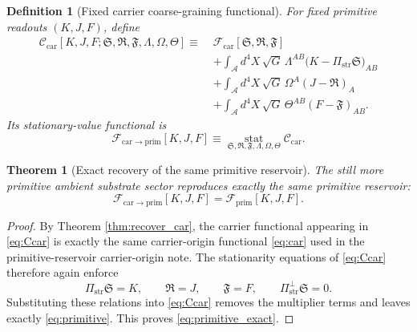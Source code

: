 \documentclass[11pt]{article}
\newcommand{\Sub}{\mathcal A}
\newcommand{\PrimFunctional}{\mathscr F_{\mathrm{prim}}}
\newcommand{\CarrierFunctional}{\mathscr F_{\mathrm{car}}}
\newcommand{\CarrierToPrim}{\mathscr F_{\mathrm{car}\to\mathrm{prim}}}
\newcommand{\PrimStrain}{K}
\newcommand{\PrimNeutral}{J}
\newcommand{\PrimFree}{F}
\newcommand{\CarrierProj}{\Pi_{\mathrm{str}}}
\newcommand{\CarrierPerp}{\Pi_{\mathrm{str}}^{\perp}}
\newcommand{\CarrierSeed}{\mathfrak S}
\newcommand{\RelabelSeed}{\mathfrak R}
\newcommand{\FreeSeed}{\mathfrak F}
\newcommand{\StrainMult}{\Lambda}
\newcommand{\NeutralMult}{\Omega}
\newcommand{\FreeMult}{\Theta}
\newtheorem{definition}{Definition}
\newtheorem{theorem}{Theorem}
\begin{document}
\begin{definition}[Fixed carrier coarse-graining functional]
\label{def:car_cg}
For fixed primitive readouts \((\PrimStrain,\PrimNeutral,\PrimFree)\), define
\begin{equation}
\begin{aligned}
\mathscr C_{\mathrm{car}}
[\PrimStrain,\PrimNeutral,\PrimFree;
\CarrierSeed,\RelabelSeed,\FreeSeed,
\StrainMult,\NeutralMult,\FreeMult]
\equiv\;
&\CarrierFunctional[\CarrierSeed,\RelabelSeed,\FreeSeed]
\\
&+\int_{\Sub} d^4X\,\sqrt{G}\,
\StrainMult^{AB}\bigl(\PrimStrain-\CarrierProj\CarrierSeed\bigr)_{AB}
\\
&+\int_{\Sub} d^4X\,\sqrt{G}\,
\NeutralMult^A(\PrimNeutral-\RelabelSeed)_A
\\
&+\int_{\Sub} d^4X\,\sqrt{G}\,
\FreeMult^{AB}(\PrimFree-\FreeSeed)_{AB}.
\end{aligned}
\label{eq:Ccar}
\end{equation}
Its stationary-value functional is
\begin{equation}
\CarrierToPrim[\PrimStrain,\PrimNeutral,\PrimFree]
\equiv
\operatorname*{stat}_{\CarrierSeed,\RelabelSeed,\FreeSeed,\StrainMult,\NeutralMult,\FreeMult}
\mathscr C_{\mathrm{car}}.
\label{eq:Fcarstat}
\end{equation}
\end{definition}

\begin{theorem}[Exact recovery of the same primitive reservoir]
\label{thm:recoverprimitive}
The still more primitive ambient substrate sector reproduces exactly the same primitive reservoir:
\begin{equation}
\CarrierToPrim[\PrimStrain,\PrimNeutral,\PrimFree]
=
\PrimFunctional[\PrimStrain,\PrimNeutral,\PrimFree].
\label{eq:primitive_exact}
\end{equation}
\end{theorem}

\begin{proof}
By Theorem \ref{thm:recover_car}, the carrier functional appearing in \eqref{eq:Ccar} is exactly the same carrier-origin functional \eqref{eq:car} used in the primitive-reservoir carrier-origin note. The stationarity equations of \eqref{eq:Ccar} therefore again enforce
\[
\CarrierProj\CarrierSeed=\PrimStrain,
\qquad
\RelabelSeed=\PrimNeutral,
\qquad
\FreeSeed=\PrimFree,
\qquad
\CarrierPerp\CarrierSeed=0.
\]
Substituting these relations into \eqref{eq:Ccar} removes the multiplier terms and leaves exactly \eqref{eq:primitive}. This proves \eqref{eq:primitive_exact}.
\end{proof}
\end{document}
